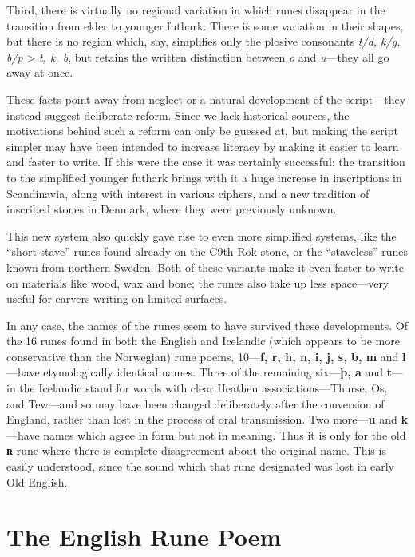 Third, there is virtually no regional variation in which runes disappear in the transition from elder to younger futhark.  There is some variation in their shapes, but there is no region which, say, simplifies only the plosive consonants \emph{t/d, k/g, b/p} > \emph{t, k, b}, but retains the written distinction between \emph{o} and \emph{u}—they all go away at once.

These facts point away from neglect or a natural development of the script—they instead suggest deliberate reform.  Since we lack historical sources, the motivations behind such a reform can only be guessed at, but making the script simpler may have been intended to increase literacy by making it easier to learn and faster to write.  If this were the case it was certainly successful: the transition to the simplified younger futhark brings with it a huge increase in inscriptions in Scandinavia, along with interest in various ciphers, and a new tradition of inscribed stones in Denmark, where they were previously unknown.

This new system also quickly gave rise to even more simplified systems, like the “short-stave” runes found already on the C9th Rök stone, or the “staveless” runes known from northern Sweden.  Both of these variants make it even faster to write on materials like wood, wax and bone; the runes also take up less space—very useful for carvers writing on limited surfaces.

In any case, the names of the runes seem to have survived these developments.  Of the 16 runes found in both the English and Icelandic (which appears to be more conservative than the Norwegian) rune poems, 10—\textbf{f, r, h, n, i, j, s, b, m} and \textbf{l}—have etymologically identical names.  Three of the remaining six—\textbf{þ, a} and \textbf{t}—in the Icelandic stand for words with clear Heathen associations—Thurse, Os, and Tew—and so may have been changed deliberately after the conversion of England, rather than lost in the process of oral transmission.  Two more—\textbf{u} and \textbf{k}—have names which agree in form but not in meaning.  Thus it is only for the old \textbf{ʀ}-rune where there is complete disagreement about the original name.  This is easily understood, since the sound which that rune designated was lost in early Old English.

\section{The English Rune Poem}\chapterStart{}

